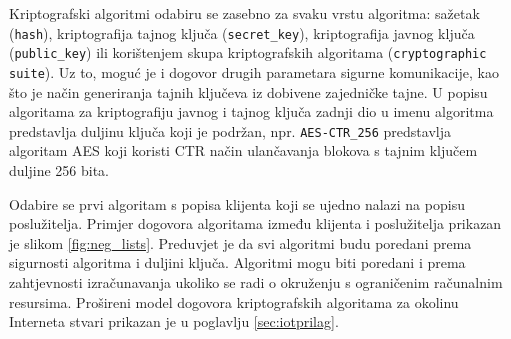 Kriptografski algoritmi odabiru se zasebno za svaku vrstu
algoritma: sažetak (\texttt{hash}), kriptografija tajnog ključa
(\texttt{secret\_key}), kriptografija javnog ključa (\texttt{public\_key}) ili
korištenjem skupa kriptografskih algoritama (\texttt{cryptographic suite}). Uz
to, moguć je i dogovor drugih parametara sigurne komunikacije, kao što je način
generiranja tajnih ključeva iz dobivene zajedničke tajne.
U popisu algoritama za kriptografiju javnog i tajnog ključa zadnji dio u imenu
algoritma predstavlja duljinu ključa koji je podržan, npr.
\texttt{AES-CTR\_256} predstavlja algoritam AES koji koristi CTR način
ulančavanja blokova s tajnim ključem duljine 256 bita.

Odabire se prvi algoritam s popisa klijenta koji se ujedno nalazi na popisu
poslužitelja. Primjer dogovora algoritama između klijenta i poslužitelja
prikazan je slikom \ref{fig:neg_lists}. Preduvjet je da svi algoritmi budu
poredani prema sigurnosti algoritma i duljini ključa. Algoritmi mogu biti poredani
i prema zahtjevnosti izračunavanja ukoliko se radi o okruženju s ograničenim
računalnim resursima. Prošireni model dogovora kriptografskih algoritama
za okolinu Interneta stvari prikazan je u poglavlju \ref{sec:iotprilag}.

